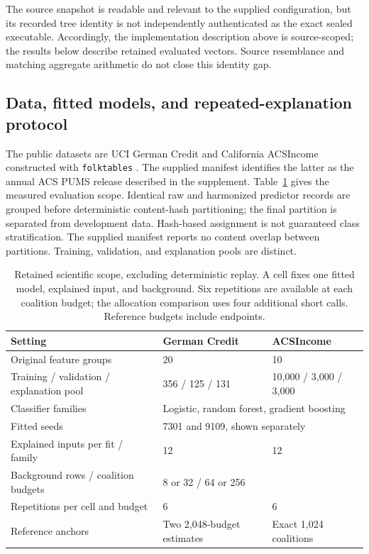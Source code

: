 \documentclass{article}
\begin{document}
The source snapshot is readable and relevant to the supplied configuration, but its recorded tree identity is not independently authenticated as the exact sealed executable. Accordingly, the implementation description above is source-scoped; the results below describe retained evaluated vectors. Source resemblance and matching aggregate arithmetic do not close this identity gap.

\subsection{Data, fitted models, and repeated-explanation protocol}
The public datasets are UCI German Credit \citep{GermanCredit} and California ACSIncome constructed with \texttt{folktables} \citep{Ding2021}. The supplied manifest identifies the latter as the annual ACS PUMS release described in the supplement. Table~\ref{tab:scope} gives the measured evaluation scope. Identical raw and harmonized predictor records are grouped before deterministic content-hash partitioning; the final partition is separated from development data. Hash-based assignment is not guaranteed class stratification. The supplied manifest reports no content overlap between partitions. Training, validation, and explanation pools are distinct.

\begin{table}[t]
\centering
\caption{Retained scientific scope, excluding deterministic replay. A cell fixes one fitted model, explained input, and background. Six repetitions are available at each coalition budget; the allocation comparison uses four additional short calls. Reference budgets include endpoints.}
\label{tab:scope}
\small
\begin{tabular}{@{}lll@{}}
\toprule
Setting & German Credit & ACSIncome\\
\midrule
Original feature groups & 20 & 10\\
Training / validation / explanation pool & 356 / 125 / 131 & 10,000 / 3,000 / 3,000\\
Classifier families & \multicolumn{2}{l}{Logistic, random forest, gradient boosting}\\
Fitted seeds & \multicolumn{2}{l}{7301 and 9109, shown separately}\\
Explained inputs per fit / family & 12 & 12\\
Background rows / coalition budgets & \multicolumn{2}{l}{8 or 32 / 64 or 256}\\
Repetitions per cell and budget & 6 & 6\\
Reference anchors & Two 2,048-budget estimates & Exact 1,024 coalitions\\
\bottomrule
\end{tabular}
\end{table}
\end{document}

